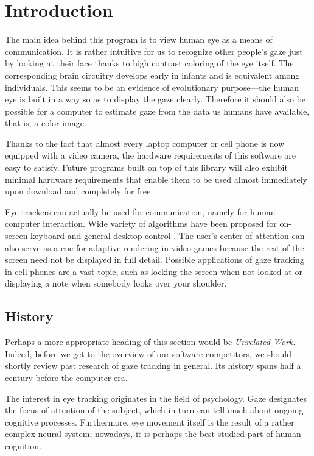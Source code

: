 \chapter{Introduction}

The main idea behind this program is to view human eye as a means of communication.
It is rather intuitive for us to recognize other people's gaze just by looking at their face thanks to high contrast coloring of the eye itself.
The corresponding brain circuitry develops early in infants  and is equivalent among individuals.
This seems to be an evidence of evolutionary purpose---the human eye is built in a way so as to display the gaze clearly.
Therefore it should also be possible for a computer to estimate gaze from the data us humans have available, that is, a color image.

Thanks to the fact that almost every laptop computer or cell phone is now equipped with a video camera, the hardware requirements of this software are easy to satisfy.
Future programs built on top of this library will also exhibit minimal hardware requirements that enable them to be used almost immediately upon download and completely for free.

Eye trackers can actually be used for communication, namely for human-computer interaction.
Wide variety of algorithms have been proposed for on-screen keyboard and general desktop control \cite{majaranta02}.
The user's center of attention can also serve as a cue for adaptive rendering in video games because the rest of the screen need not be displayed in full detail.
Possible applications of gaze tracking in cell phones are a vast topic, such as locking the screen when not looked at or displaying a note when somebody looks over your shoulder.


\section{History}

Perhaps a more appropriate heading of this section would be \textit{Unrelated Work}.
Indeed, before we get to the overview of our software competitors, we should shortly review past research of gaze tracking in general.
Its history spans half a century before the computer era.

The interest in eye tracking originates in the field of psychology.
Gaze designates the focus of attention of the subject, which in turn can tell much about ongoing cognitive processes.
Furthermore, eye movement itself is the result of a rather complex neural system; nowadays, it is perhaps the best studied part of human cognition.

